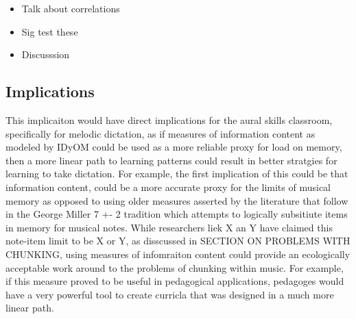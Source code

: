 \documentclass[]{book}
\providecommand{\tightlist}{%
  \setlength{\itemsep}{0pt}\setlength{\parskip}{0pt}}
\begin{document}
\begin{itemize}
\tightlist
\item
  Talk about correlations
\item
  Sig test these
\item
  Discusssion
\end{itemize}

\hypertarget{implications}{%
\subsection{Implications}\label{implications}}

This implicaiton would have direct implications for the aural skills classroom, specifically for melodic dictation, as if measures of information content as modeled by IDyOM could be used as a more reliable proxy for load on memory, then a more linear path to learning patterns could result in better stratgies for learning to take dictation.
For example, the first implication of this could be that information content, could be a more accurate proxy for the limits of musical memory as opposed to using older measures asserted by the literature that follow in the George Miller 7 +- 2 tradition which attempts to logically subsitiute items in memory for musical notes.
While researchers liek X an Y have claimed this note-item limit to be X or Y, as disscussed in SECTION ON PROBLEMS WITH CHUNKING, using measures of infomraiton content could provide an ecologically acceptable work around to the problems of chunking within music.
For example, if this measure proved to be useful in pedagogical applications, pedagoges would have a very powerful tool to create curricla that was designed in a much more linear path.
\end{document}
